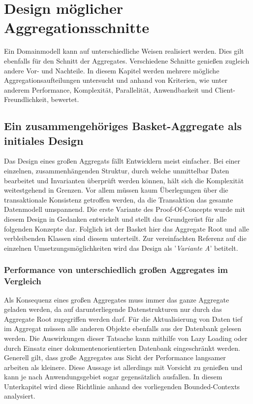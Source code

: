 \chapter{Design möglicher Aggregationsschnitte }

Ein Domainmodell kann auf unterschiedliche Weisen realisiert werden. Dies gilt ebenfalls für den Schnitt der Aggregates. Verschiedene Schnitte genießen zugleich andere Vor- und Nachteile. In diesem Kapitel werden mehrere mögliche Aggregationsaufteilungen untersucht und anhand von Kriterien, wie unter anderem Performance, Komplexität, Parallelität, Anwendbarkeit und Client-Freundlichkeit, bewertet.

\section{Ein zusammengehöriges Basket-Aggregate als initiales Design}

Das Design eines großen Aggregats fällt Entwicklern meist einfacher. Bei einer einzelnen, zusammenhängenden Struktur, durch welche unmittelbar Daten bearbeitet und Invarianten überprüft werden können, hält sich die Komplexität weitestgehend in Grenzen. Vor allem müssen kaum Überlegungen über die transaktionale Konsistenz getroffen werden, da die Transaktion das gesamte Datenmodell umspannend. Die erste Variante des Proof-Of-Concepts wurde mit diesem Design in Gedanken entwickelt und stellt das Grundgerüst für alle folgenden Konzepte dar. Folglich ist der Basket hier das Aggregate Root und alle verbleibenden Klassen sind diesem unterteilt. Zur vereinfachten Referenz auf die einzelnen Umsetzungsmöglichkeiten wird das Design als '\emph{Variante A}' betitelt.


\subsection{Performance von unterschiedlich großen Aggregates im Vergleich}

Als Konsequenz eines großen Aggregates muss immer das ganze Aggregate geladen werden, da auf darunterliegende Datenstrukturen nur durch das Aggregate Root zugegriffen werden darf. Für die Aktualisierung von Daten tief im Aggregat müssen alle anderen Objekte ebenfalls aus der Datenbank gelesen werden. Die Auswirkungen dieser Tatsache kann mithilfe von \gls{Lazy Loading} oder durch Einsatz einer dokumentenorientierten Datenbank eingeschränkt werden. Generell gilt, dass große Aggregates aus Sicht der Performance langsamer arbeiten als kleinere. Diese Aussage ist allerdings mit Vorsicht zu genießen und kann je nach Anwendungsgebiet sogar gegensätzlich ausfallen. In diesem Unterkapitel wird diese Richtlinie anhand des vorliegenden Bounded-Contexts analysiert.

